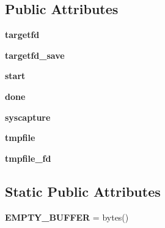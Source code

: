 \subsection*{Public Attributes}
\begin{DoxyCompactItemize}
\item 
\mbox{\label{class__pytest_1_1capture_1_1_f_d_capture_binary_a6b0589f8c794d848b066ee9fc8122462}} 
{\bfseries targetfd}
\item 
\mbox{\label{class__pytest_1_1capture_1_1_f_d_capture_binary_a2e281675c2b72db6c52d8326be0ef3ab}} 
{\bfseries targetfd\+\_\+save}
\item 
\mbox{\label{class__pytest_1_1capture_1_1_f_d_capture_binary_a5b9b787fe9ceb8c73857c861d615c997}} 
{\bfseries start}
\item 
\mbox{\label{class__pytest_1_1capture_1_1_f_d_capture_binary_a3ccb66393614aa6b6201f0431c71d68a}} 
{\bfseries done}
\item 
\mbox{\label{class__pytest_1_1capture_1_1_f_d_capture_binary_a7c4fff5a722d489ab4e04b05fb365e56}} 
{\bfseries syscapture}
\item 
\mbox{\label{class__pytest_1_1capture_1_1_f_d_capture_binary_ad0735373f1e3aca446286d8463c0a88a}} 
{\bfseries tmpfile}
\item 
\mbox{\label{class__pytest_1_1capture_1_1_f_d_capture_binary_aed424ae721e26867e77af043cfd64d8f}} 
{\bfseries tmpfile\+\_\+fd}
\end{DoxyCompactItemize}
\subsection*{Static Public Attributes}
\begin{DoxyCompactItemize}
\item 
\mbox{\label{class__pytest_1_1capture_1_1_f_d_capture_binary_aeb03b8c7ef0cef08b96e7d51c5746cb9}} 
{\bfseries E\+M\+P\+T\+Y\+\_\+\+B\+U\+F\+F\+ER} = bytes()
\end{DoxyCompactItemize}


